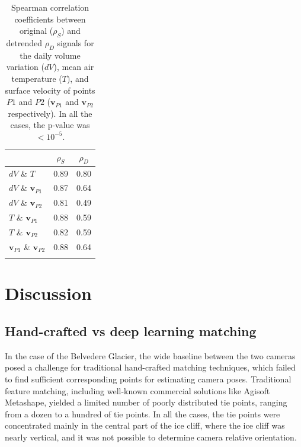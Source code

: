 \begin{table}
  \centering
  \caption{Spearman correlation coefficients between original (\(\rho_S\))
    and detrended \(\rho_D\) signals for the daily volume variation (\(dV\)), mean air
    temperature
    (\(T\)), and surface velocity of points \(P1\) and \(P2\) (\(\mathbf{v}_{P1}\) and
    \(\mathbf{v}_{P2}\) respectively).
    In all the cases, the p-value was \(< 10^{-5}\).}
  \label{tab:4:correlation_coefficients}
  \begin{tabular}{lcc}
                                               & \(\rho_S\) & \(\rho_D\) \\
    \hline\noalign{\smallskip}

    \(dV\) \& \(T\)                            & 0.89       & 0.80       \\
    \(dV\) \& \(\mathbf{v}_{P1}\)              & 0.87       & 0.64       \\
    \(dV\) \& \(\mathbf{v}_{P2}\)              & 0.81       & 0.49       \\
    \(T\) \&  \(\mathbf{v}_{P1}\)              & 0.88       & 0.59       \\
    \(T\) \&  \(\mathbf{v}_{P2}\)              & 0.82       & 0.59       \\
    \(\mathbf{v}_{P1}\) \& \(\mathbf{v}_{P2}\) & 0.88       & 0.64       \\
    \noalign{\smallskip}\hline
  \end{tabular}
\end{table}

\section{Discussion}
\label{sec:4:discussion}

\subsection{Hand-crafted vs deep learning matching}\label{sec:4:handcrafted_vs_dl}

In the case of the Belvedere Glacier, the wide baseline between the two cameras posed a
challenge for traditional hand-crafted matching techniques, which failed to find
sufficient corresponding points for estimating camera poses.
Traditional feature matching, including well-known commercial solutions like
Agisoft Metashape, yielded a limited number of poorly distributed tie points, ranging
from a dozen to a hundred of tie points.
In all the cases, the tie points were concentrated mainly in the central part of the ice
cliff, where the ice cliff was nearly vertical, and it was not possible to determine
camera relative orientation.

